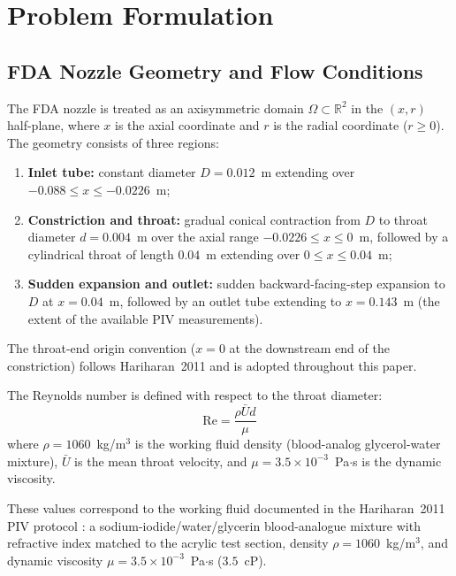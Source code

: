 \documentclass[12pt,a4paper]{article}
\newcommand{\Reyn}{\mathrm{Re}}    %
\begin{document}
\section{Problem Formulation}
\label{sec:formulation}

\subsection{FDA Nozzle Geometry and Flow Conditions}
\label{sec:geometry}

The FDA nozzle is treated as an axisymmetric domain
$\Omega \subset \mathbb{R}^2$ in the $(x, r)$ half-plane, where
$x$ is the axial coordinate and $r$ is the radial coordinate
($r \geq 0$). The geometry consists of three regions:
\begin{enumerate}[leftmargin=*, itemsep=2pt]
  \item \textbf{Inlet tube:} constant diameter
        $D = 0.012$~m extending over $-0.088 \leq x \leq -0.0226$~m;
  \item \textbf{Constriction and throat:} gradual conical
        contraction from $D$ to throat diameter
        $d = 0.004$~m over the axial range
        $-0.0226 \leq x \leq 0$~m, followed by a cylindrical
        throat of length $0.04$~m extending over
        $0 \leq x \leq 0.04$~m;
  \item \textbf{Sudden expansion and outlet:} sudden
        backward-facing-step expansion to $D$ at $x = 0.04$~m,
        followed by an outlet tube extending to $x = 0.143$~m
        (the extent of the available PIV measurements).
\end{enumerate}
The throat-end origin convention ($x = 0$ at the downstream end
of the constriction) follows Hariharan~2011
\cite{Hariharan2011FDA} and is adopted throughout this paper.

The Reynolds number is defined with respect to the throat diameter:
\begin{equation}
  \Reyn = \frac{\rho \bar{U} d}{\mu}
  \label{eq:reynolds}
\end{equation}
where $\rho = 1060$~kg/m$^3$ is the working fluid density
(blood-analog glycerol-water mixture), $\bar{U}$ is the mean
throat velocity, and $\mu = 3.5 \times 10^{-3}$~Pa$\cdot$s is the
dynamic viscosity.

These values correspond to the working fluid documented in the
Hariharan~2011 PIV protocol \cite{Hariharan2011FDA}: a
sodium-iodide/water/glycerin blood-analogue mixture with
refractive index matched to the acrylic test section, density
$\rho = 1060$~kg/m$^3$, and dynamic viscosity
$\mu = 3.5 \times 10^{-3}$~Pa$\cdot$s ($3.5$~cP).
\end{document}
